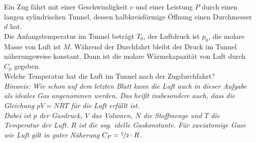 \begin{Exercise}[title = Tunnel, origin = {EstPhO 2009}, difficulty = 3, label = train]
	Ein Zug fährt mit einer Geschwindigkeit $v$ und einer Leistung $P$ durch einen langen zylindrischen Tunnel, dessen halbkreisförmige Öffnung einen Durchmesser $d$ hat.\\
	Die Anfangstemperatur im Tunnel beträgt $T_0$, der Luftdruck ist $p_0$, die molare Masse von Luft ist $M$. Während der Durchfahrt bleibt der Druck im Tunnel näherungsweise konstant. Dann ist die molare Wärmekapazität von Luft durch $C_p$ gegeben.\\
	Welche Temperatur hat die Luft im Tunnel nach der Zugdurchfahrt?\\
	\textit{Hinweis: Wie schon auf dem letzten Blatt kann die Luft auch in dieser Aufgabe als \textit{ideales Gas} angenommen werden. Das heißt insbesondere auch, dass die Gleichung $pV = NRT$ für die Luft erfüllt ist. \\
	Dabei ist $p$ der Gasdruck, $V$ das Volumen, $N$ die Stoffmenge und $T$ die Temperatur der Luft. $R$ ist die sog. idelle Gaskonstante. Für zweiatomige Gase wie Luft gilt in guter Näherung $C_P = \nicefrac{7}{2}\cdot R$.}
\end{Exercise}